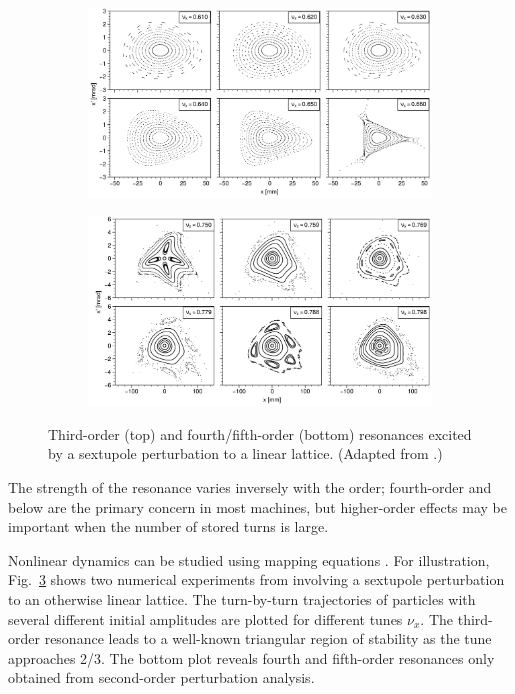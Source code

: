 \begin{figure}[!p]
    \begin{subfigure}[b]{1.0\textwidth}
        \includegraphics[width=\textwidth]{Images/chapter1/sextupole.png}
        \label{fig:sextupole_a}
    \end{subfigure}
    \vfill
    \vspace*{1.0cm}
    \vfill
    \begin{subfigure}[b]{\textwidth}
        \centering
        \includegraphics[width=\textwidth]{Images/chapter1/sextupole_second_order.png}
        \label{fig:sextupole_b}
    \end{subfigure}
    \caption{Third-order (top) and fourth/fifth-order (bottom) resonances excited by a sextupole perturbation to a linear lattice. (Adapted from \cite{Lee2011}.)}
    \label{fig:sextupole}
\end{figure}
%
The strength of the resonance varies inversely with the order; fourth-order and below are the primary concern in most machines, but higher-order effects may be important when the number of stored turns is large. 

Nonlinear dynamics can be studied using mapping equations \cite{Reichl1992}. For illustration, Fig.~\ref{fig:sextupole} shows two numerical experiments from \cite{Lee2011} involving a sextupole perturbation to an otherwise linear lattice. The turn-by-turn trajectories of particles with several different initial amplitudes are plotted for different tunes $\nu_x$. The third-order resonance leads to a well-known triangular region of stability as the tune approaches 2/3. The bottom plot reveals fourth and fifth-order resonances only obtained from second-order perturbation analysis.